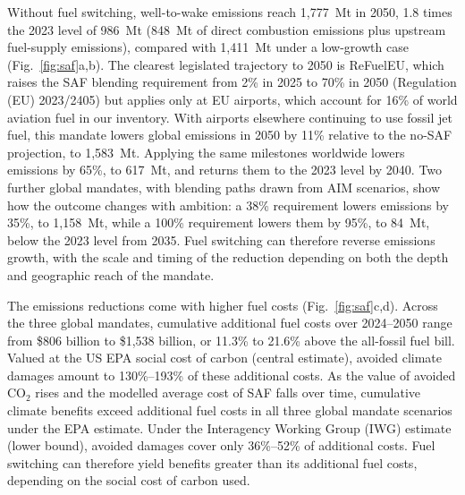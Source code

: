 \documentclass[12pt]{extarticle}
\begin{document}
Without fuel switching, well-to-wake emissions reach 1,777~Mt in 2050, 1.8 times the 2023 level of 986~Mt (848~Mt of direct combustion emissions plus upstream fuel-supply emissions), compared with 1,411~Mt under a low-growth case (Fig.~\ref{fig:saf}a,b). The clearest legislated trajectory to 2050 is ReFuelEU, which raises the SAF blending requirement from 2\% in 2025 to 70\% in 2050 (Regulation (EU) 2023/2405) but applies only at EU airports, which account for 16\% of world aviation fuel in our inventory. With airports elsewhere continuing to use fossil jet fuel, this mandate lowers global emissions in 2050 by 11\% relative to the no-SAF projection, to 1,583~Mt. Applying the same milestones worldwide lowers emissions by 65\%, to 617~Mt, and returns them to the 2023 level by 2040. Two further global mandates, with blending paths drawn from AIM scenarios, show how the outcome changes with ambition: a 38\% requirement lowers emissions by 35\%, to 1,158~Mt, while a 100\% requirement lowers them by 95\%, to 84~Mt, below the 2023 level from 2035. Fuel switching can therefore reverse emissions growth, with the scale and timing of the reduction depending on both the depth and geographic reach of the mandate.

The emissions reductions come with higher fuel costs (Fig.~\ref{fig:saf}c,d). Across the three global mandates, cumulative additional fuel costs over 2024--2050 range from \$806 billion to \$1,538 billion, or 11.3\% to 21.6\% above the all-fossil fuel bill. Valued at the US EPA social cost of carbon (central estimate), avoided climate damages amount to 130\%--193\% of these additional costs. As the value of avoided CO$_2$ rises and the modelled average cost of SAF falls over time, cumulative climate benefits exceed additional fuel costs in all three global mandate scenarios under the EPA estimate. Under the Interagency Working Group (IWG) estimate (lower bound), avoided damages cover only 36\%--52\% of additional costs. Fuel switching can therefore yield benefits greater than its additional fuel costs, depending on the social cost of carbon used.
\end{document}
